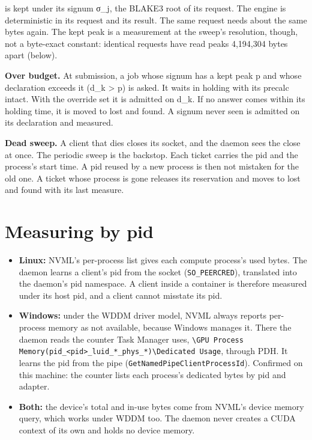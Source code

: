 is kept under its signum σ\_\allowbreak{}j, the BLAKE3 root of its request. The engine is deterministic in its request and its result. The same request needs about the same bytes again. The kept peak is a measurement at the sweep's resolution, though, not a byte-exact constant: identical requests have read peaks 4,194,304 bytes apart (below).

\textbf{Over budget.} At submission, a job whose signum has a kept peak p and whose declaration exceeds it (d\_\allowbreak{}k > p) is asked. It waits in holding with its precalc intact. With the override set it is admitted on d\_\allowbreak{}k. If no answer comes within its holding time, it is moved to lost and found. A signum never seen is admitted on its declaration and measured.

\textbf{Dead sweep.} A client that dies closes its socket, and the daemon sees the close at once. The periodic sweep is the backstop. Each ticket carries the pid and the process's start time. A pid reused by a new process is then not mistaken for the old one. A ticket whose process is gone releases its reservation and moves to lost and found with its last measure.

\section{\texorpdfstring{Measuring by pid}{Measuring by pid}}

\begin{itemize}
\item \textbf{Linux:} NVML's per-process list gives each compute process's used bytes. The daemon learns a client's pid from the socket (\texttt{SO\_\allowbreak{}PEERCRED}), translated into the daemon's pid namespace. A client inside a container is therefore measured under its host pid, and a client cannot misstate its pid.
\item \textbf{Windows:} under the WDDM driver model, NVML always reports per-process memory as not available, because Windows manages it. There the daemon reads the counter Task Manager uses, \texttt{\textbackslash{}GPU Process Memory(pid\_\allowbreak{}<pid>\_\allowbreak{}luid\_\allowbreak{}*\_\allowbreak{}phys\_\allowbreak{}*)\textbackslash{}Dedicated Usage}, through PDH. It learns the pid from the pipe (\texttt{Get\allowbreak{}Named\allowbreak{}Pipe\allowbreak{}Client\allowbreak{}Process\allowbreak{}Id}). Confirmed on this machine: the counter lists each process's dedicated bytes by pid and adapter.
\item \textbf{Both:} the device's total and in-use bytes come from NVML's device memory query, which works under WDDM too. The daemon never creates a CUDA context of its own and holds no device memory.
\end{itemize}


